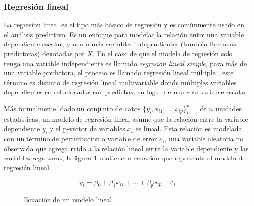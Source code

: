 \subsubsection{Regresión lineal}

La regresión lineal es el tipo más básico de regresión y es comúnmente usado en el análisis predictivo.
Es un enfoque para modelar la relación entre una variable dependiente escalar, y una o más variables independientes (también llamadas predictoras) denotadas por $X$. 
En el caso de que el modelo de regresión solo tenga una variable independiente es llamado \textit{regresión lineal simple}, para más de una variable predictora, el proceso es llamado regresión lineal múltiple \cite{DAFreedmanStatisticalModels}, este término es distinto de regresión lineal multivariable donde múltiples variables dependientes correlacionadas son predichas, en lugar de una sola variable escalar \cite{ACRencherWFChristensenMethods}.

Más formalmente, dado un conjunto de datos $\{y_i,x_{i1},...,x_{ip}\}_{i=1}^n$ de $n$ unidades estadísticas, un modelo de regresión lineal asume que la relación entre la variable dependiente $y_i$ y el p-vector de variables $x_i$ es lineal. Esta relación es modelada
con un término de perturbación o variable de error $\varepsilon_i$, una variable aleatoria no observada que agrega ruido a la relación lineal entre la variable dependiente y las variables regresoras, la figura \ref{ec:regresionLineal} contiene la ecuación que representa el modelo de regresión lineal.

\begin{figure}
\[ y_i= \beta_0 + \beta_1x_{i1} +...+ \beta_px_{ip} + \varepsilon_i \]
\caption{Ecuación de un modelo lineal}
\label{ec:regresionLineal}
\end{figure}

